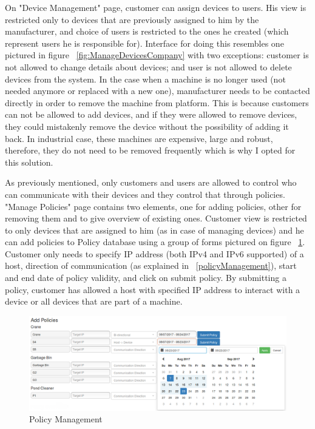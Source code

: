 On "Device Management" page, customer can assign devices to users. His view is restricted only to devices that are previously assigned to him by the manufacturer, and choice of users is restricted to the ones he created (which represent users he is responsible for). Interface for doing this resembles one pictured in figure ~\ref{fig:ManageDevicesCompany} with two exceptions: customer is not allowed to change details about devices; and user is not allowed to 
delete devices from the system. In the case when a machine is no longer used (not needed anymore or replaced with a new one), manufacturer needs to be contacted directly in order to remove the machine from platform. This is because customers can not be allowed to add devices, and if they were allowed to remove devices, they could mistakenly remove the device without the possibility of adding it back. In industrial case, these machines are expensive, large and robust, therefore, they do not need to be removed frequently which is why I opted for this solution.

As previously mentioned, only customers and users are allowed to control who can communicate with their devices and they control that through policies. "Manage Policies" page contains two elements, one for adding policies, other for removing them and to give overview of existing ones. Customer view is restricted to only devices that are assigned to him (as in case of managing devices) and he can add policies to Policy database using a group of forms pictured on figure ~\ref{fig:ManagePolicies}. Customer only needs to specify IP address (both IPv4 and IPv6 supported) of a host, direction of communication (as explained in ~\ref{policyManagement}), start and end date of policy validity, and click on submit policy. By submitting a policy, customer has allowed a host with specified IP address to interact with a device or all devices that are part of a machine.

\begin{figure}[ht]
	\begin{center}
		\includegraphics[width=\textwidth]{images/implementation/ManagePolicies}
		\caption{Policy Management}
		\label{fig:ManagePolicies}
	\end{center}
\end{figure}

